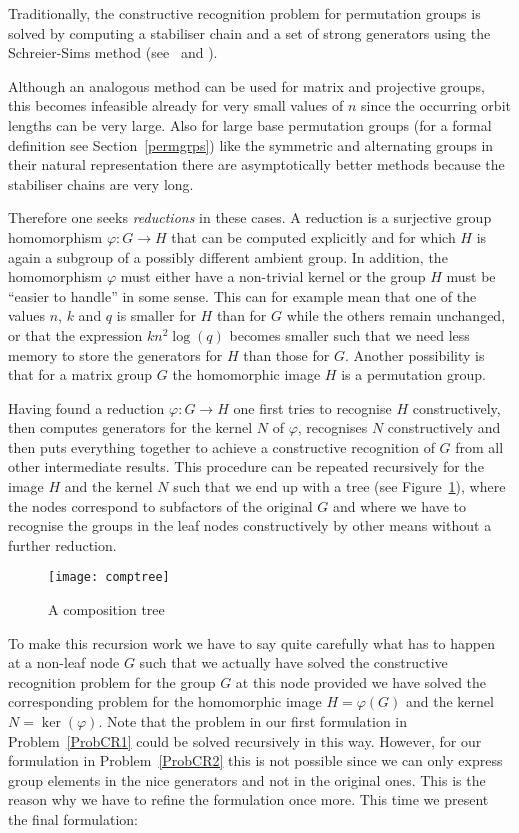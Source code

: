 Traditionally, the constructive recognition problem for permutation
groups is solved by computing a stabiliser chain and a set of strong
generators using the Schreier-Sims method (see~\cite{Si} and \cite{Ser}). 

Although an analogous method can be used for matrix and projective groups,
this becomes infeasible already for very small values of $n$ since the
occurring orbit lengths can be very large. Also for large base permutation
groups (for a formal definition see Section~\ref{permgrps}) like the
symmetric and alternating groups in their natural representation there
are asymptotically better methods because the stabiliser chains are very long.

Therefore one seeks \emph{reductions} in these cases. A reduction is
a surjective group homomorphism $\varphi : G \to H$ that can be computed
explicitly and for which $H$ is again a subgroup of a possibly different
ambient group. In addition, the homomorphism $\varphi$ must either have
a non-trivial kernel or the group $H$ must be ``easier to handle'' in some
sense. This can for example mean that one of the values $n$, $k$ and
$q$ is smaller for $H$ than for $G$ while the others remain unchanged,
or that the expression $kn^2\log(q)$ becomes smaller such that we need
less memory to store the generators for $H$ than those for $G$.
Another possibility is that for a matrix group $G$ the homomorphic image
$H$ is a permutation group.

Having found a reduction $\varphi : G \to H$ one first tries to recognise
$H$ constructively, then computes generators for the kernel $N$ of
$\varphi$, recognises $N$ constructively and then puts everything together
to achieve a constructive recognition of $G$ from all other intermediate
results. This procedure can be repeated recursively for the image $H$ and
the kernel $N$ such that we end up with a tree (see
Figure~\ref{comptreefig}), where the nodes correspond
to subfactors of the original $G$ and where we have to recognise
the groups in the leaf nodes constructively by other means without
a further reduction.

\begin{figure}
\begin{center}
\texttt{[image: comptree]}
\end{center}
\caption{A composition tree}
\label{comptreefig}
\end{figure}

To make this recursion work we have to say quite carefully what has to
happen at a non-leaf node $G$ such that we actually have solved the
constructive recognition problem for the group $G$ at this node provided
we have solved the corresponding problem for the homomorphic image
$H=\varphi(G)$ and the kernel $N = \ker(\varphi)$. Note that the problem
in our first formulation in Problem~\ref{ProbCR1} could be solved
recursively in this way. However, for our formulation in Problem~\ref{ProbCR2}
this is not possible since we can only express group elements in the nice
generators and not in the original ones. This is the reason why we have to
refine the formulation once more. This time we present the final
formulation:

